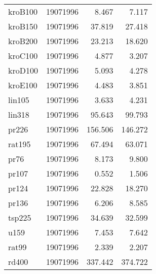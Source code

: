 \begin{center}
\begin{longtable}{llrr}
kroB100  & 19071996 & 8.467& 7.117\\
kroB150  & 19071996 & 37.819& 27.418\\
kroB200  & 19071996 & 23.213& 18.620\\
kroC100  & 19071996 & 4.877& 3.207\\
kroD100  & 19071996 & 5.093& 4.278\\
kroE100  & 19071996 & 4.483& 3.851\\
lin105  & 19071996 & 3.633& 4.231\\
lin318  & 19071996 & 95.643& 99.793\\
pr226  & 19071996 & 156.506& 146.272\\
rat195  & 19071996 & 67.494& 63.071\\
pr76  & 19071996 & 8.173& 9.800\\
pr107  & 19071996 & 0.552& 1.506\\
pr124  & 19071996 & 22.828& 18.270\\
pr136  & 19071996 & 6.206& 8.585\\
tsp225  & 19071996 & 34.639& 32.599\\
u159  & 19071996 & 7.453& 7.642\\
rat99  & 19071996 & 2.339&2.207\\
rd400  & 19071996 & 337.442& 374.722\\
\end{longtable}
\end{center}


